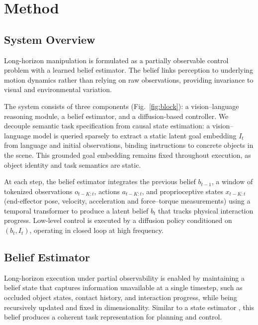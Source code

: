\documentclass[conference]{IEEEtran}
\begin{document}
\section{Method}
\subsection{System Overview}
Long-horizon manipulation is formulated as a partially observable control problem with a learned belief estimator. The belief links perception to underlying motion dynamics rather than relying on raw observations, providing invariance to visual and environmental variation.

The system consists of three components (Fig.~\ref{fig:block}): a vision–language reasoning module, a belief estimator, and a diffusion-based controller. We decouple semantic task specification from causal state estimation: a vision–language model is queried sparsely to extract a static latent goal embedding $I_t$ from language and initial observations, binding instructions to concrete objects in the scene. This grounded goal embedding remains fixed throughout execution, as object identity and task semantics are static.

At each step, the belief estimator integrates the previous belief $b_{t-1}$, a window of tokenized observations $o_{t-K:t}$, actions $a_{t-K:t}$, and proprioceptive states $x_{t-K:t}$ (end-effector pose, velocity, acceleration and force–torque measurements) using a temporal transformer to produce a latent belief $b_t$ that tracks physical interaction progress. Low-level control is executed by a diffusion policy conditioned on $(b_t, I_t)$, operating in closed loop at high frequency. 


\subsection{Belief Estimator}
\label{subsec:belief}
Long-horizon execution under partial observability is enabled by maintaining a belief state that captures information unavailable at a single timestep, such as occluded object states, contact history, and interaction progress, while being recursively updated and fixed in dimensionality. Similar to a state estimator \cite{chen2003bayesian}, this belief produces a coherent task representation for planning and control.
\end{document}
